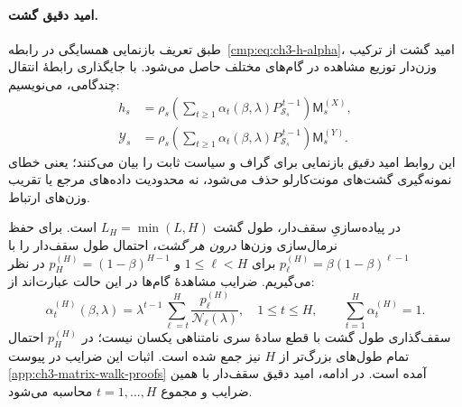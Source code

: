 \paragraph{امید دقیق گشت.}
طبق تعریف بازنمایی همسایگی در
رابطه~\eqref{cmp:eq:ch3-h-alpha}،
امید گشت از ترکیب وزن‌دار
توزیع مشاهده در گام‌های مختلف حاصل
می‌شود. با جایگذاری رابطهٔ انتقال
چندگامی، می‌نویسیم:
\begin{equation}\label{cmp:eq:ch3-exact-matrix-neighborhood}
\boxed{
\begin{aligned}
h_s
&=\rho_s\left(
\sum_{t\ge1}\alpha_t(\beta,\lambda)
P_{\mathcal S_s}^{\,t-1}\right)\mathsf M_s^{(X)},\\
\mathscr Y_s
&=\rho_s\left(
\sum_{t\ge1}\alpha_t(\beta,\lambda)
P_{\mathcal S_s}^{\,t-1}\right)\mathsf M_s^{(Y)}.
\end{aligned}
}
\end{equation}
این روابط امید \emph{دقیق} بازنمایی
برای گراف و سیاست ثابت را بیان می‌کنند؛
یعنی خطای نمونه‌گیری گشت‌های
مونت‌کارلو حذف می‌شود، نه محدودیت
داده‌های مرجع یا تقریب وزن‌های ارتباط.

در پیاده‌سازیِ سقف‌دار، طول گشت
$L_H=\min(L,H)$ است. برای حفظ
نرمال‌سازی وزن‌ها \emph{درون هر گشت}،
احتمال طول سقف‌دار را با
$p_\ell^{(H)}=\beta(1-\beta)^{\ell-1}$
برای $1\le\ell<H$ و
$p_H^{(H)}=(1-\beta)^{H-1}$
در نظر می‌گیریم. ضرایب مشاهدهٔ
گام‌ها در این حالت عبارت‌اند از:
\begin{equation}\label{cmp:eq:ch3-capped-alpha}
\boxed{
\alpha_t^{(H)}(\beta,\lambda)
=\lambda^{t-1}
\sum_{\ell=t}^{H}
\frac{p_\ell^{(H)}}{\mathcal N_\ell(\lambda)},
\quad 1\le t\le H,
\qquad \sum_{t=1}^{H}\alpha_t^{(H)}=1.
}
\end{equation}
سقف‌گذاری طول گشت با قطع سادهٔ
سری نامتناهی یکسان نیست؛ در
$p_H^{(H)}$ احتمال تمام طول‌های
بزرگ‌تر از $H$ نیز جمع شده است.
اثبات این ضرایب در پیوست~
\ref{app:ch3-matrix-walk-proofs} آمده است.
در ادامه، امید دقیق سقف‌دار با
همین ضرایب و مجموع $t=1,\ldots,H$
محاسبه می‌شود.

